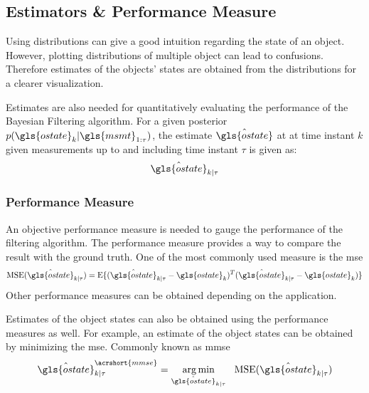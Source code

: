 \documentclass[a4paper]{article}
\begin{document}
\subsection{Estimators \& Performance Measure}
Using distributions can give a good intuition regarding the state of an object. However, plotting distributions of multiple object can lead to confusions. Therefore estimates of the objects' states are obtained from the distributions for a clearer visualization.\par
Estimates are also needed for quantitatively evaluating the performance of the Bayesian Filtering algorithm. For a given posterior $p(\gls{ostate}_k|\gls{msmt}_{1:\tau})$, the estimate $\hat{\gls{ostate}}$ at at time instant $k$ given measurements up to and including time instant $\tau$ is given as:
$$\hat{\gls{ostate}}_{k|\tau}$$
\subsubsection{Performance Measure}
An objective performance measure is needed to gauge the performance of the filtering algorithm. The performance measure provides a way to compare the result with the ground truth. One of the most commonly used measure is the \acrfull{mse}
\begin{equation}
	\label{eq:mse}
	\mse(\hat{\gls{ostate}}_{k|\tau})=\mean\{(\hat{\gls{ostate}}_{k|\tau}-\gls{ostate}_k)^T(\hat{\gls{ostate}}_{k|\tau}-\gls{ostate}_k)\}
\end{equation}
Other performance measures can be obtained depending on the application.\par
Estimates of the object states can also be obtained using the performance measures as well. For example, an estimate of the object states can be obtained by minimizing the \gls{mse}. Commonly known as \acrfull{mmse}
$$\hat{\gls{ostate}}_{k|\tau}^{\acrshort{mmse}}= \underset{\hat{\gls{ostate}}_{k|\tau}}{\arg\min}~~\mse(\hat{\gls{ostate}}_{k|\tau})$$
\end{document}
